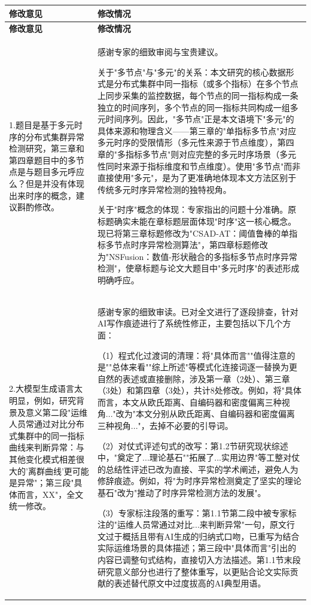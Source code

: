 \documentclass[12pt,a4paper]{article}
\begin{document}
\begin{longtable}{|p{}|p{}|}
\hline
\centering\bfseries 修改意见 & \centering\arraybackslash\bfseries 修改情况 \\
\hline
\endfirsthead
\hline
\centering\bfseries 修改意见 & \centering\arraybackslash\bfseries 修改情况 \\
\hline
\endhead

1.题目是基于多元时序的分布式集群异常检测研究，第三章和第四章题目中的多节点是与题目多元呼应么？但是并没有体现出来时序的概念，建议斟酌修改。
&
感谢专家的细致审阅与宝贵建议。

关于"多节点"与"多元"的关系：本文研究的核心数据形式是分布式集群中同一指标（或多个指标）在多个节点上同步采集的监控数据，每个节点的同一指标构成一条独立的时间序列，多个节点的同一指标共同构成一组多元时间序列。因此，"多节点"正是本文语境下"多元"的具体来源和物理含义——第三章的"单指标多节点"对应多元时序的受限情形（多元性来源于节点维度），第四章的"多指标多节点"则对应完整的多元时序场景（多元性同时来源于指标维度和节点维度）。使用"多节点"而非直接使用"多元"，是为了更准确地体现本文方法区别于传统多元时序异常检测的独特视角。

关于"时序"概念的体现：专家指出的问题十分准确。原标题确实未能在章标题层面体现"时序"这一核心概念。现已将第三章标题修改为"CSAD-AT：阈值鲁棒的单指标多节点时序异常检测算法"，第四章标题修改为"NSFusion：数值-形状融合的多指标多节点时序异常检测"，使章标题与论文大题目中"多元时序"的表述形成明确呼应。
\\
\hline

2.大模型生成语言太明显，例如，研究背景及意义第二段"运维人员常通过对比分布式集群中的同一指标曲线来判断异常：与其他变化模式相差很大的'离群曲线'更可能是异常"；第三段"具体而言，XX"，全文统一修改。
&
感谢专家的细致审读。已对全文进行了逐段排查，针对AI写作痕迹进行了系统性修正，主要包括以下几个方面：

（1）程式化过渡词的清理：将"具体而言""值得注意的是""总体来看""综上所述"等模式化连接词逐一替换为更自然的表述或直接删除，涉及第一章（2处）、第三章（3处）和第四章（3处），共计8处修改。例如，将"具体而言，本文从欧氏距离、自编码器和密度偏离三种视角..."改为"本文分别从欧氏距离、自编码器和密度偏离三种视角..."，去掉不必要的引导词。

（2）对仗式评述句式的改写：第1.2节研究现状综述中，"奠定了...理论基石""拓展了...实用边界"等工整对仗的总结性评述已改为直接、平实的学术阐述，避免人为修辞痕迹。例如，将"为时序异常检测奠定了坚实的理论基石"改为"推动了时序异常检测方法的发展"。

（3）专家标注段落的重写：第1.1节第二段中被专家标注的"运维人员常通过对比...来判断异常"一句，原文行文过于概括且带有AI生成的归纳式口吻，已重写为结合实际运维场景的具体描述；第三段中"具体而言"引出的内容已调整句式结构，直接切入方法描述。第1.1节末段研究意义部分也进行了整体重写，以更贴合论文实际贡献的表述替代原文中过度拔高的AI典型用语。


\end{longtable}
\end{document}
